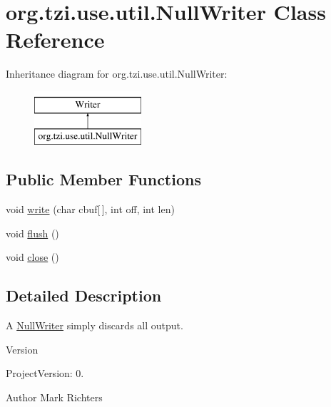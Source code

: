 \hypertarget{classorg_1_1tzi_1_1use_1_1util_1_1_null_writer}{\section{org.\-tzi.\-use.\-util.\-Null\-Writer Class Reference}
\label{classorg_1_1tzi_1_1use_1_1util_1_1_null_writer}
}
Inheritance diagram for org.\-tzi.\-use.\-util.\-Null\-Writer\-:\begin{figure}[H]
\begin{center}
\leavevmode
\includegraphics[height=2.000000cm]{classorg_1_1tzi_1_1use_1_1util_1_1_null_writer}
\end{center}
\end{figure}
\subsection*{Public Member Functions}
\begin{DoxyCompactItemize}
\item 
void \hyperlink{classorg_1_1tzi_1_1use_1_1util_1_1_null_writer_aa15229064e3a2b676cec138d16ad7da8}{write} (char cbuf\mbox{[}$\,$\mbox{]}, int off, int len)
\item 
void \hyperlink{classorg_1_1tzi_1_1use_1_1util_1_1_null_writer_a263763826cfe1bf76472861befc62d48}{flush} ()
\item 
void \hyperlink{classorg_1_1tzi_1_1use_1_1util_1_1_null_writer_ae5fe397ad53400a68b7b5ba4a74eb493}{close} ()
\end{DoxyCompactItemize}


\subsection{Detailed Description}
A \hyperlink{classorg_1_1tzi_1_1use_1_1util_1_1_null_writer}{Null\-Writer} simply discards all output.

\begin{DoxyVersion}{Version}

\end{DoxyVersion}
\begin{DoxyParagraph}{Project\-Version\-:}
0. 
\end{DoxyParagraph}
\begin{DoxyAuthor}{Author}
Mark Richters 
\end{DoxyAuthor}


